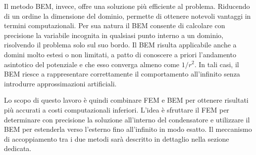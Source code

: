 \documentclass[11pt,onecolumn]{article}
\begin{document}
\begin{appendices}
Il metodo BEM, invece, offre una soluzione più efficiente al problema. Riducendo di un ordine la dimensione del dominio, permette di ottenere notevoli vantaggi in termini computazionali. Per sua natura il BEM consente di calcolare con precisione la variabile incognita in qualsiasi punto interno a un dominio, risolvendo il problema solo sul suo bordo. Il BEM risulta applicabile anche a domini molto estesi o non limitati, a patto di conoscere a priori l’andamento asintotico del potenziale e che esso converga almeno come $1/r^2$. In tali casi, il BEM riesce a rappresentare correttamente il comportamento all’infinito senza introdurre approssimazioni artificiali.

Lo scopo di questo lavoro è quindi combinare FEM e BEM per ottenere risultati più accurati a costi computazionali inferiori. L’idea è sfruttare il FEM per determinare con precisione la soluzione all’interno del condensatore e utilizzare il BEM per estenderla verso l’esterno fino all’infinito in modo esatto. Il meccanismo di accoppiamento tra i due metodi sarà descritto in dettaglio nella sezione dedicata.



\end{appendices}
\end{document}
